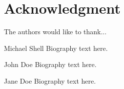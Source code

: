 \documentclass[journal,transmag]{IEEEtran}
\begin{document}
\section*{Acknowledgment}
The authors would like to thank...




%
%
%
 


% 

\begin{IEEEbiography}{Michael Shell}
Biography text here.
\end{IEEEbiography}

\begin{IEEEbiographynophoto}{John Doe}
Biography text here.
\end{IEEEbiographynophoto}


\begin{IEEEbiographynophoto}{Jane Doe}
Biography text here.
\end{IEEEbiographynophoto}






\end{document}
